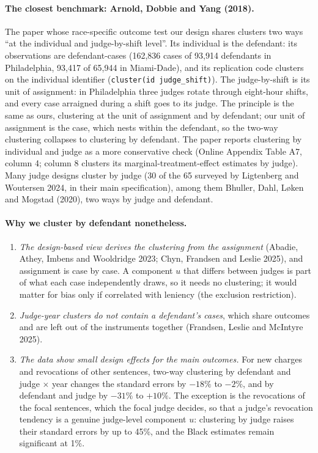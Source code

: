 \documentclass[11pt]{article}
\begin{document}
\paragraph{The closest benchmark: Arnold, Dobbie and Yang (2018).} The paper whose race-specific outcome test our design shares clusters two ways ``at the individual and judge-by-shift level''. Its individual is the defendant: its observations are defendant-cases (162,836 cases of 93,914 defendants in Philadelphia, 93,417 of 65,944 in Miami-Dade), and its replication code clusters on the individual identifier (\texttt{cluster(id judge\_shift)}). The judge-by-shift is its unit of assignment: in Philadelphia three judges rotate through eight-hour shifts, and every case arraigned during a shift goes to its judge. The principle is the same as ours, clustering at the unit of assignment and by defendant; our unit of assignment is the case, which nests within the defendant, so the two-way clustering collapses to clustering by defendant. The paper reports clustering by individual and judge as a more conservative check (Online Appendix Table A7, column 4; column 8 clusters its marginal-treatment-effect estimates by judge). Many judge designs cluster by judge (30 of the 65 surveyed by Ligtenberg and Woutersen 2024, in their main specification), among them Bhuller, Dahl, Løken and Mogstad (2020), two ways by judge and defendant.

\paragraph{Why we cluster by defendant nonetheless.}
\begin{enumerate}
  \item \emph{The design-based view derives the clustering from the assignment} (Abadie, Athey, Imbens and Wooldridge 2023; Chyn, Frandsen and Leslie 2025), and assignment is case by case. A component $u$ that differs between judges is part of what each case independently draws, so it needs no clustering; it would matter for bias only if correlated with leniency (the exclusion restriction).
  \item \emph{Judge-year clusters do not contain a defendant's cases}, which share outcomes and are left out of the instruments together (Frandsen, Leslie and McIntyre 2025).
  \item \emph{The data show small design effects for the main outcomes.} For new charges and revocations of other sentences, two-way clustering by defendant and judge $\times$ year changes the standard errors by $-18\%$ to $-2\%$, and by defendant and judge by $-31\%$ to $+10\%$. The exception is the revocations of the focal sentences, which the focal judge decides, so that a judge's revocation tendency is a genuine judge-level component $u$: clustering by judge raises their standard errors by up to 45\%, and the Black estimates remain significant at 1\%.
\end{enumerate}
\end{document}
